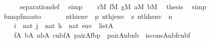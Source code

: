 \begin{isabellebody}
\ \ \ \ \isamarkupfalse%
\ separation{\isacharunderscore}{\kern0pt}def\ \isamarkupfalse%
\ simp\isanewline
\ \ \isamarkupfalse%
\ {\isacartoucheopen}r{\isasymin}M{\isacartoucheclose}\ {\isacartoucheopen}f{\isasymin}M{\isacartoucheclose}\ {\isacartoucheopen}g{\isasymin}M{\isacartoucheclose}\ {\isacartoucheopen}a{\isasymin}M{\isacartoucheclose}\ {\isacartoucheopen}b{\isasymin}M{\isacartoucheclose}\ \isamarkupfalse%
\ {\isacharquery}{\kern0pt}thesis\ \isamarkupfalse%
\ simp\isanewline
{}\isamarkupfalse%
%
\endisatagproof
{\isafoldproof}%
%
\isadelimproof
\isanewline
%
\endisadelimproof
\isanewline
\isanewline
\isanewline
\isanewline
{}\isamarkupfalse%
\ funsp{\isacharunderscore}{\kern0pt}fm{\isacharunderscore}{\kern0pt}auto{\isacharcolon}{\kern0pt}\isanewline
\ \ \isanewline
\ \ \ \ {\isachardoublequoteopen}nth{\isacharparenleft}{\kern0pt}i{\isacharcomma}{\kern0pt}env{\isacharparenright}{\kern0pt}\ {\isacharequal}{\kern0pt}\ p{\isachardoublequoteclose}\ {\isachardoublequoteopen}nth{\isacharparenleft}{\kern0pt}j{\isacharcomma}{\kern0pt}env{\isacharparenright}{\kern0pt}\ {\isacharequal}{\kern0pt}\ z{\isachardoublequoteclose}\ {\isachardoublequoteopen}nth{\isacharparenleft}{\kern0pt}h{\isacharcomma}{\kern0pt}env{\isacharparenright}{\kern0pt}\ {\isacharequal}{\kern0pt}\ n{\isachardoublequoteclose}\isanewline
\ \ \ \ {\isachardoublequoteopen}i\ {\isasymin}\ nat{\isachardoublequoteclose}\ {\isachardoublequoteopen}j\ {\isasymin}\ nat{\isachardoublequoteclose}\ {\isachardoublequoteopen}h\ {\isasymin}\ nat{\isachardoublequoteclose}\ {\isachardoublequoteopen}env\ {\isasymin}\ list{\isacharparenleft}{\kern0pt}A{\isacharparenright}{\kern0pt}{\isachardoublequoteclose}\isanewline
\ \ \isanewline
\ \ \ \ {\isachardoublequoteopen}{\isacharparenleft}{\kern0pt}{\isasymexists}f{\isasymin}A{\isachardot}{\kern0pt}\ {\isasymexists}b{\isasymin}A{\isachardot}{\kern0pt}\ {\isasymexists}nb{\isasymin}A{\isachardot}{\kern0pt}\ {\isasymexists}cnbf{\isasymin}A{\isachardot}{\kern0pt}\ pair{\isacharparenleft}{\kern0pt}{\isacharhash}{\kern0pt}{\isacharhash}{\kern0pt}A{\isacharcomma}{\kern0pt}f{\isacharcomma}{\kern0pt}b{\isacharcomma}{\kern0pt}p{\isacharparenright}{\kern0pt}\ {\isacharampersand}{\kern0pt}\ pair{\isacharparenleft}{\kern0pt}{\isacharhash}{\kern0pt}{\isacharhash}{\kern0pt}A{\isacharcomma}{\kern0pt}n{\isacharcomma}{\kern0pt}b{\isacharcomma}{\kern0pt}nb{\isacharparenright}{\kern0pt}\ {\isacharampersand}{\kern0pt}\ is{\isacharunderscore}{\kern0pt}cons{\isacharparenleft}{\kern0pt}{\isacharhash}{\kern0pt}{\isacharhash}{\kern0pt}A{\isacharcomma}{\kern0pt}nb{\isacharcomma}{\kern0pt}f{\isacharcomma}{\kern0pt}cnbf{\isacharparenright}{\kern0pt}\ {\isacharampersand}{\kern0pt}\isanewline

\end{isabellebody}

